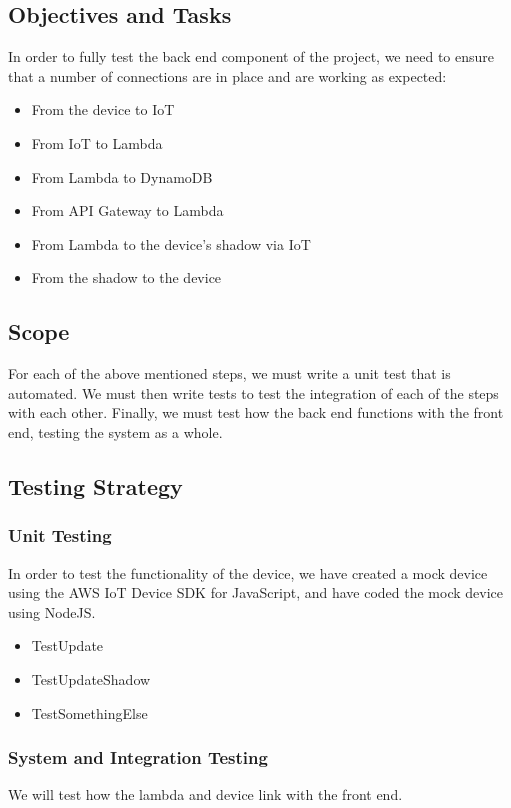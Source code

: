 \documentclass{article}
\begin{document}
	\subsection{Objectives and Tasks}
		In order to fully test the back end component of the project, we need to ensure that a number of connections are in place and are working as expected:
		\begin{itemize}
			\item{From the device to IoT}
			\item{From IoT to Lambda}
			\item{From Lambda to DynamoDB}
			\\
			\item{From API Gateway to Lambda}
			\item{From Lambda to the device's shadow via IoT}
			\item{From the shadow to the device}
		\end{itemize}
	
	\subsection{Scope}
		For each of the above mentioned steps, we must write a unit test that is automated. We must then write tests to test
		the integration of each of the steps with each other. Finally, we must test how the back end functions with the front
		end, testing the system as a whole.
	
	\subsection{Testing Strategy}
		\subsubsection{Unit Testing}
			In order to test the functionality of the device, we have created a mock device using the AWS IoT Device SDK for
			JavaScript, and have coded the mock device using NodeJS.  
			\begin{itemize}
				\item TestUpdate
				\item TestUpdateShadow
				\item TestSomethingElse
			\end{itemize}
		\subsubsection{System and Integration Testing}
			We will test how the lambda and device link with the front end.
\end{document}
